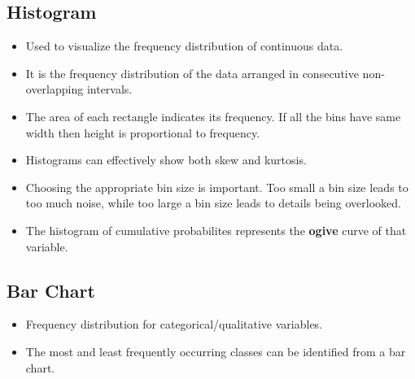 \documentclass{article}
\theoremstyle{plain}
\theoremstyle{definition}
\begin{document}
\subsection{Histogram}
\begin{itemize}
    \item Used to visualize the frequency distribution of continuous data. 
    
    \item It is the frequency distribution of the data arranged in consecutive non-overlapping intervals. 
    
    \item The area of each rectangle indicates its frequency. If all the bins have same width then height is proportional to frequency. 
    
    \item Histograms can effectively show both skew and kurtosis.
    
    \item Choosing the appropriate bin size is important. Too small a bin size leads to too much noise, while too large a bin size leads to details being overlooked.
    
    \item The histogram of cumulative probabilites represents the \textbf{ogive} curve of that variable. 
\end{itemize}

\subsection{Bar Chart}
\begin{itemize}
    \item Frequency distribution for categorical/qualitative variables. 
    
    \item The most and least frequently occurring classes can be identified from a bar chart. 
\end{itemize}
\end{document}
